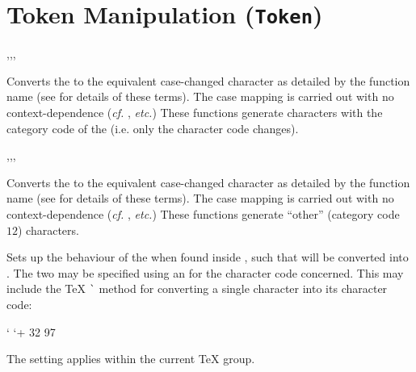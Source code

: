 \documentclass[oneside]{book}
\begin{document}
\chapter{Token Manipulation (\texttt{Token})}

\begin{function}{\CharLowercase,\CharUppercase,\CharTitlecase,\CharFoldcase}
\begin{syntax}
 
 
 
 
\end{syntax}
Converts the  to the equivalent case-changed character
as detailed by the function name (see %
 for details of these terms). The case mapping
is carried out with no context-dependence (\emph{cf.} ,
\emph{etc.}) These functions generate characters with the category code
of the  (i.e. only the character code changes).
\end{function}

\begin{function}{\CharStrLowercase,\CharStrUppercase,\CharStrTitlecase,\CharStrFoldcase}
\begin{syntax}
 
 
 
 
\end{syntax}
Converts the  to the equivalent case-changed character
as detailed by the function name (see %
 for details of these terms). The case mapping
is carried out with no context-dependence (\emph{cf.} ,
\emph{etc.}) These functions generate \enquote{other} (category code $12$)
characters.
\end{function}

\begin{function}{\CharSetLccode}
\begin{syntax}
  
\end{syntax}
Sets up the behaviour of the  when
found inside , such that 
will be converted into . The two 
may be specified using an  for the character code
concerned. This may include the \TeX{} \verb|`|
method for converting a single character into its character code:
\begin{codehigh}
 {`\a} %
 {`\A + 32}
 {97}
\end{codehigh}
The setting applies within the current \TeX{} group.
\end{function}
\end{document}
